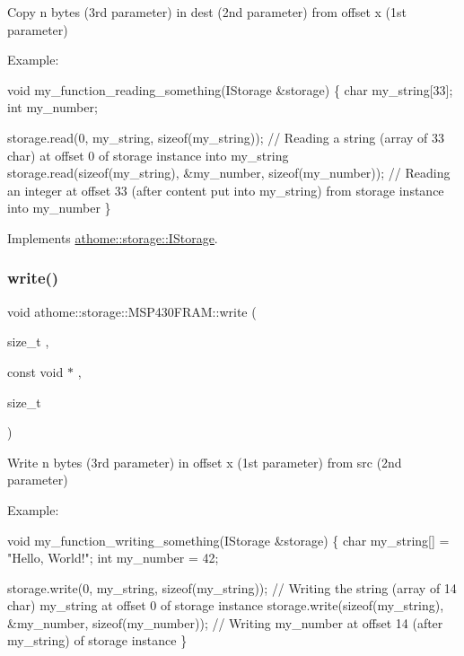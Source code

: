 Copy n bytes (3rd parameter) in dest (2nd parameter) from offset x (1st parameter)

Example\+:


\begin{DoxyCode}
\textcolor{keywordtype}{void} my\_function\_reading\_something(IStorage &storage) \{
  \textcolor{keywordtype}{char} my\_string[33];
  \textcolor{keywordtype}{int} my\_number;

  storage.read(0, my\_string, \textcolor{keyword}{sizeof}(my\_string)); \textcolor{comment}{// Reading a string (array of 33 char) at offset 0 of
       storage instance into my\_string}
  storage.read(\textcolor{keyword}{sizeof}(my\_string), &my\_number, \textcolor{keyword}{sizeof}(my\_number)); \textcolor{comment}{// Reading an integer at offset 33 (after
       content put into my\_string) from storage instance into my\_number}
\}
\end{DoxyCode}
 

Implements \mbox{\hyperlink{classathome_1_1storage_1_1_i_storage_af623393cdf559addf167463ce4e7005e}{athome\+::storage\+::\+I\+Storage}}.

\mbox{\label{classathome_1_1storage_1_1_m_s_p430_f_r_a_m_ae6b7a6d178233f9e54394360b34c3bca}} 
\subsubsection{\texorpdfstring{write()}{write()}}
{\footnotesize\ttfamily void athome\+::storage\+::\+M\+S\+P430\+F\+R\+A\+M\+::write (\begin{DoxyParamCaption}\item[{size\+\_\+t}]{,  }\item[{const void $\ast$}]{,  }\item[{size\+\_\+t}]{ }\end{DoxyParamCaption})\hspace{0.3cm}{\ttfamily [virtual]}}

Write n bytes (3rd parameter) in offset x (1st parameter) from src (2nd parameter)

Example\+:


\begin{DoxyCode}
\textcolor{keywordtype}{void} my\_function\_writing\_something(IStorage &storage) \{
  \textcolor{keywordtype}{char} my\_string[] = \textcolor{stringliteral}{"Hello, World!"};
  \textcolor{keywordtype}{int} my\_number = 42;

  storage.write(0, my\_string, \textcolor{keyword}{sizeof}(my\_string)); \textcolor{comment}{// Writing the string (array of 14 char) my\_string at
       offset 0 of storage instance}
  storage.write(\textcolor{keyword}{sizeof}(my\_string), &my\_number, \textcolor{keyword}{sizeof}(my\_number)); \textcolor{comment}{// Writing my\_number at offset 14 (after
       my\_string) of storage instance}
\}
\end{DoxyCode}
 

